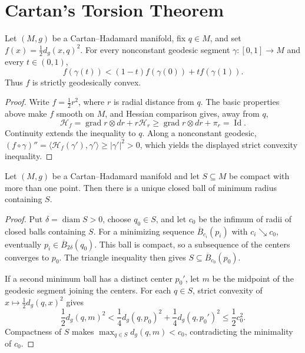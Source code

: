 \section*{Cartan's Torsion Theorem}

\begin{lemma}
\label{lem:geodesic-convexity-distance-squared}
Let $(M,g)$ be a Cartan--Hadamard manifold, fix $q\in M$, and set
$f(x)=\frac12d_g(x,q)^2$.  For every nonconstant geodesic segment
$\gamma:[0,1]\to M$ and every $t\in(0,1)$,
\begin{equation}
f(\gamma(t))<(1-t)f(\gamma(0))+tf(\gamma(1)). \tag{12.1}
\end{equation}
Thus $f$ is strictly geodesically convex.
\begin{proof}
\sketch Write $f=\frac12r^2$, where $r$ is radial distance from $q$.
The basic properties above make $f$ smooth on $M$, and Hessian comparison
gives, away from $q$,
\[
\mathcal H_f=\operatorname{grad}r\otimes dr+r\mathcal H_r
\geq\operatorname{grad}r\otimes dr+\pi_r=\operatorname{Id}.
\]
Continuity extends the inequality to $q$.  Along a nonconstant geodesic,
$(f\circ\gamma)''=\langle\mathcal H_f(\gamma'),\gamma'\rangle
\geq|\gamma'|^2>0$, which yields the displayed strict convexity inequality.
\end{proof}
\end{lemma}

\begin{lemma}
\label{lem:unique-minimal-enclosing-ball}
Let $(M,g)$ be a Cartan--Hadamard manifold and let $S\subseteq M$ be compact
with more than one point.  Then there is a unique closed ball of minimum
radius containing $S$.
\begin{proof}
\sketch Put $\delta=\operatorname{diam}S>0$, choose $q_0\in S$, and let $c_0$
be the infimum of radii of closed balls containing $S$.  For a minimizing
sequence $\overline B_{c_i}(p_i)$ with $c_i\searrow c_0$, eventually
$p_i\in\overline B_{2\delta}(q_0)$.  This ball is compact, so a subsequence of
the centers converges to $p_0$.  The triangle inequality then gives
$S\subseteq\overline B_{c_0}(p_0)$.

If a second minimum ball has a distinct center $p_0'$, let $m$ be the midpoint
of the geodesic segment joining the centers.  For each $q\in S$, strict
convexity of $x\mapsto\frac12d_g(q,x)^2$ gives
\[
\frac12d_g(q,m)^2<\frac14d_g(q,p_0)^2+
\frac14d_g(q,p_0')^2\leq\frac12c_0^2.
\]
Compactness of $S$ makes $\max_{q\in S}d_g(q,m)<c_0$, contradicting the
minimality of $c_0$.
\end{proof}
\end{lemma}

